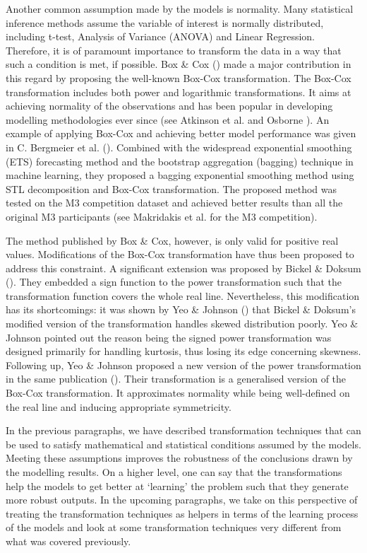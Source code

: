Another common assumption made by the models is normality. Many statistical inference methods assume the variable of interest is normally distributed, including t-test, Analysis of Variance (ANOVA) and Linear Regression. Therefore, it is of paramount importance to transform the data in a way that such a condition is met, if possible. Box \& Cox (\citeyear{box1964analysis}) made a major contribution in this regard by proposing the well-known Box-Cox transformation. The Box-Cox transformation includes both power and logarithmic transformations. It aims at achieving normality of the observations and has been popular in developing modelling methodologies ever since (see Atkinson et al. \citeyear{atkinson2021box} and Osborne \citeyear{osborne2010improving}). An example of applying Box-Cox and achieving better model performance was given in C. Bergmeier et al. (\citeyear{bergmeir2016bagging}). Combined with the widespread exponential smoothing (ETS) forecasting method and the bootstrap aggregation (bagging) technique in machine learning, they proposed a bagging exponential smoothing method using STL decomposition and Box-Cox transformation. The proposed method was tested on the M3 competition dataset and achieved better results than all the original M3 participants (see Makridakis et al. \citeyear{makridakis2000m3} for the M3 competition).

The method published by Box \& Cox, however, is only valid for positive real values. Modifications of the Box-Cox transformation have thus been proposed to address this constraint. A significant extension was proposed by Bickel \& Doksum (\citeyear{bickel1981analysis}). They embedded a sign function to the power transformation such that the transformation function covers the whole real line. Nevertheless, this modification has its shortcomings: it was shown by Yeo \& Johnson (\citeyear{10.1093/Biomet/87.4.954}) that Bickel \& Doksum's modified version of the transformation handles skewed distribution poorly. Yeo \& Johnson pointed out the reason being the signed power transformation was designed primarily for handling kurtosis, thus losing its edge concerning skewness. Following up, Yeo \& Johnson proposed a new version of the power transformation in the same publication (\citeyear{10.1093/Biomet/87.4.954}). Their transformation is a generalised version of the Box-Cox transformation. It approximates normality while being well-defined on the real line and inducing appropriate symmetricity.

In the previous paragraphs, we have described transformation techniques that can be used to satisfy mathematical and statistical conditions assumed by the models. Meeting these assumptions improves the robustness of the conclusions drawn by the modelling results. On a higher level, one can say that the transformations help the models to get better at `learning' the problem such that they generate more robust outputs. In the upcoming paragraphs, we take on this perspective of treating the transformation techniques as helpers in terms of the learning process of the models and look at some transformation techniques very different from what was covered previously.

